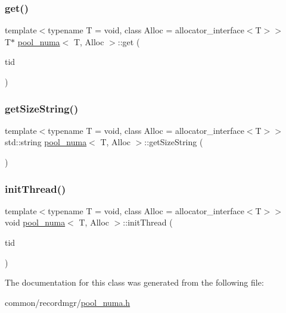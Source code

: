 \mbox{\label{classpool__numa_ada7ec291f407081e3c597635fc20ee69}} 
\subsubsection{\texorpdfstring{get()}{get()}}
{\footnotesize\ttfamily template$<$typename T  = void, class Alloc  = allocator\+\_\+interface$<$\+T$>$$>$ \\
T$\ast$ \hyperlink{classpool__numa}{pool\+\_\+numa}$<$ T, Alloc $>$\+::get (\begin{DoxyParamCaption}\item[{const int}]{tid }\end{DoxyParamCaption})\hspace{0.3cm}{\ttfamily [inline]}}

\mbox{\label{classpool__numa_ab2ef3aa401ebf9cf6577e1a583fcc157}} 
\subsubsection{\texorpdfstring{get\+Size\+String()}{getSizeString()}}
{\footnotesize\ttfamily template$<$typename T  = void, class Alloc  = allocator\+\_\+interface$<$\+T$>$$>$ \\
std\+::string \hyperlink{classpool__numa}{pool\+\_\+numa}$<$ T, Alloc $>$\+::get\+Size\+String (\begin{DoxyParamCaption}{ }\end{DoxyParamCaption})\hspace{0.3cm}{\ttfamily [inline]}}

\mbox{\label{classpool__numa_a1066d0f94458e2080802e87627699841}} 
\subsubsection{\texorpdfstring{init\+Thread()}{initThread()}}
{\footnotesize\ttfamily template$<$typename T  = void, class Alloc  = allocator\+\_\+interface$<$\+T$>$$>$ \\
void \hyperlink{classpool__numa}{pool\+\_\+numa}$<$ T, Alloc $>$\+::init\+Thread (\begin{DoxyParamCaption}\item[{const int}]{tid }\end{DoxyParamCaption})\hspace{0.3cm}{\ttfamily [inline]}}



The documentation for this class was generated from the following file\+:\begin{DoxyCompactItemize}
\item 
common/recordmgr/\hyperlink{pool__numa_8h}{pool\+\_\+numa.\+h}\end{DoxyCompactItemize}
